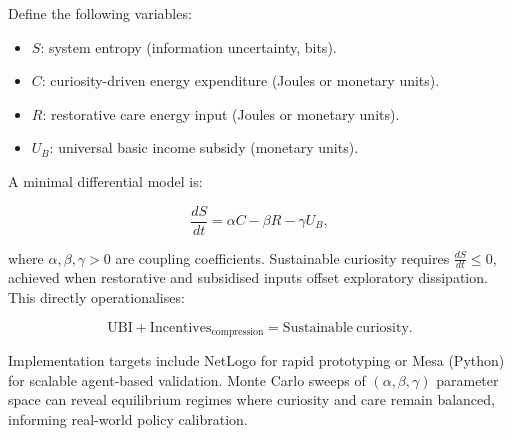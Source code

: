\documentclass[12pt,a4paper]{article}
\begin{document}
Define the following variables:

\begin{itemize}
\item $S$: system entropy (information uncertainty, bits).
\item $C$: curiosity-driven energy expenditure (Joules or monetary units).
\item $R$: restorative care energy input (Joules or monetary units).
\item $U_B$: universal basic income subsidy (monetary units).
\end{itemize}

A minimal differential model is:

\[
\frac{dS}{dt} = \alpha C - \beta R - \gamma U_B,
\]

where \(\alpha, \beta, \gamma > 0\) are coupling coefficients. 
Sustainable curiosity requires \(\frac{dS}{dt} \leq 0\), 
achieved when restorative and subsidised inputs offset exploratory dissipation. 
This directly operationalises:

\[
\mathrm{UBI} + \mathrm{Incentives}_{\mathrm{compression}} = \mathrm{Sustainable\ curiosity}.
\]

Implementation targets include NetLogo for rapid prototyping 
or Mesa (Python) for scalable agent-based validation. 
Monte Carlo sweeps of \((\alpha,\beta,\gamma)\) parameter space 
can reveal equilibrium regimes where curiosity and care remain balanced, 
informing real-world policy calibration.



\end{document}
